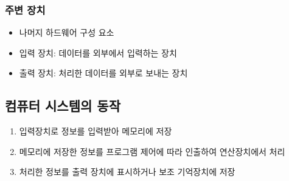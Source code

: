 \subsubsection{주변 장치}
\begin{itemize}
	\item 나머지 하드웨어 구성 요소
	\item 입력 장치: 데이터를 외부에서 입력하는 장치
	\item 출력 장치: 처리한 데이터를 외부로 보내는 장치
\end{itemize}

\subsection{컴퓨터 시스템의 동작}
\begin{enumerate}
	\item 입력장치로 정보를 입력받아 메모리에 저장
	\item 메모리에 저장한 정보를 프로그램 제어에 따라 인출하여 연산장치에서 처리
	\item 처리한 정보를 출력 장치에 표시하거나 보조 기억장치에 저장
\end{enumerate}

\pagebreak